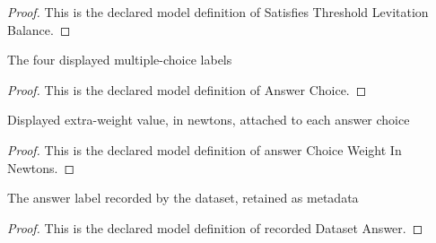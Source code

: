 \begin{proof}
  This is the declared model definition of Satisfies Threshold Levitation Balance.
\end{proof}
\begin{definition}
  \label{def:physics:phyx-mini-0946:phyxminiproblems-problemphyxmini0946-answerchoice}
  The four displayed multiple-choice labels
\end{definition}
\begin{proof}
  This is the declared model definition of Answer Choice.
\end{proof}
\begin{definition}
  \label{def:physics:phyx-mini-0946:phyxminiproblems-problemphyxmini0946-answerchoiceweightinnewtons}
  Displayed extra-weight value, in newtons, attached to each answer choice
\end{definition}
\begin{proof}
  This is the declared model definition of answer Choice Weight In Newtons.
\end{proof}
\begin{definition}
  \label{def:physics:phyx-mini-0946:phyxminiproblems-problemphyxmini0946-recordeddatasetanswer}
  The answer label recorded by the dataset, retained as metadata
\end{definition}
\begin{proof}
  This is the declared model definition of recorded Dataset Answer.
\end{proof}
